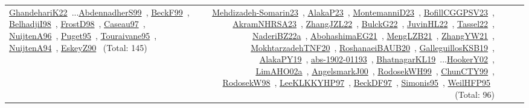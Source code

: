 {\begin{longtable}{p{3cm}r>{\raggedright\arraybackslash}p{6cm}>{\raggedright\arraybackslash}p{6cm}>{\raggedright\arraybackslash}p{8cm}}
\href{../works/GhandehariK22.pdf}{GhandehariK22}~\cite{GhandehariK22}...\href{../works/AbdennadherS99.pdf}{AbdennadherS99}~\cite{AbdennadherS99}, \href{../works/BeckF99.pdf}{BeckF99}~\cite{BeckF99}, \href{../works/BelhadjiI98.pdf}{BelhadjiI98}~\cite{BelhadjiI98}, \href{../works/FrostD98.pdf}{FrostD98}~\cite{FrostD98}, \href{../works/Caseau97.pdf}{Caseau97}~\cite{Caseau97}, \href{../works/NuijtenA96.pdf}{NuijtenA96}~\cite{NuijtenA96}, \href{../works/Puget95.pdf}{Puget95}~\cite{Puget95}, \href{../works/Touraivane95.pdf}{Touraivane95}~\cite{Touraivane95}, \href{../works/NuijtenA94.pdf}{NuijtenA94}~\cite{NuijtenA94}, \href{../works/EskeyZ90.pdf}{EskeyZ90}~\cite{EskeyZ90} (Total: 145) & \href{../works/Mehdizadeh-Somarin23.pdf}{Mehdizadeh-Somarin23}~\cite{Mehdizadeh-Somarin23}, \href{../works/AlakaP23.pdf}{AlakaP23}~\cite{AlakaP23}, \href{../works/MontemanniD23.pdf}{MontemanniD23}~\cite{MontemanniD23}, \href{../works/BofillCGGPSV23.pdf}{BofillCGGPSV23}~\cite{BofillCGGPSV23}, \href{../works/AkramNHRSA23.pdf}{AkramNHRSA23}~\cite{AkramNHRSA23}, \href{../works/ZhangJZL22.pdf}{ZhangJZL22}~\cite{ZhangJZL22}, \href{../works/BulckG22.pdf}{BulckG22}~\cite{BulckG22}, \href{../works/JuvinHL22.pdf}{JuvinHL22}~\cite{JuvinHL22}, \href{../works/Tassel22.pdf}{Tassel22}~\cite{Tassel22}, \href{../works/NaderiBZ22a.pdf}{NaderiBZ22a}~\cite{NaderiBZ22a}, \href{../works/AbohashimaEG21.pdf}{AbohashimaEG21}~\cite{AbohashimaEG21}, \href{../works/MengLZB21.pdf}{MengLZB21}~\cite{MengLZB21}, \href{../works/ZhangYW21.pdf}{ZhangYW21}~\cite{ZhangYW21}, \href{../works/MokhtarzadehTNF20.pdf}{MokhtarzadehTNF20}~\cite{MokhtarzadehTNF20}, \href{../works/RoshanaeiBAUB20.pdf}{RoshanaeiBAUB20}~\cite{RoshanaeiBAUB20}, \href{../works/GalleguillosKSB19.pdf}{GalleguillosKSB19}~\cite{GalleguillosKSB19}, \href{../works/AlakaPY19.pdf}{AlakaPY19}~\cite{AlakaPY19}, \href{../works/abs-1902-01193.pdf}{abs-1902-01193}~\cite{abs-1902-01193}, \href{../works/BhatnagarKL19.pdf}{BhatnagarKL19}~\cite{BhatnagarKL19}...\href{../works/HookerY02.pdf}{HookerY02}~\cite{HookerY02}, \href{../works/LimAHO02a.pdf}{LimAHO02a}~\cite{LimAHO02a}, \href{../works/AngelsmarkJ00.pdf}{AngelsmarkJ00}~\cite{AngelsmarkJ00}, \href{../works/RodosekWH99.pdf}{RodosekWH99}~\cite{RodosekWH99}, \href{../works/ChunCTY99.pdf}{ChunCTY99}~\cite{ChunCTY99}, \href{../works/RodosekW98.pdf}{RodosekW98}~\cite{RodosekW98}, \href{../works/LeeKLKKYHP97.pdf}{LeeKLKKYHP97}~\cite{LeeKLKKYHP97}, \href{../works/BeckDF97.pdf}{BeckDF97}~\cite{BeckDF97}, \href{../works/Simonis95.pdf}{Simonis95}~\cite{Simonis95}, \href{../works/WeilHFP95.pdf}{WeilHFP95}~\cite{WeilHFP95} (Total: 96)\\

\end{longtable}}
